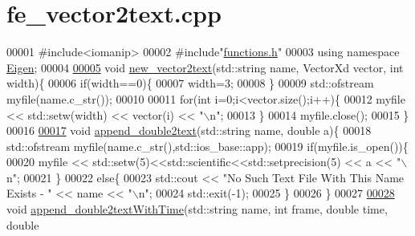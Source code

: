 \hypertarget{fe__vector2text_8cpp_source}{}\section{fe\+\_\+vector2text.\+cpp}
\label{fe__vector2text_8cpp_source}

\begin{DoxyCode}
00001 \textcolor{preprocessor}{#include<iomanip>}
00002 \textcolor{preprocessor}{#include"\hyperlink{functions_8h}{functions.h}"}
00003 \textcolor{keyword}{using namespace }\hyperlink{namespace_eigen}{Eigen};
00004 
\hyperlink{fe__vector2text_8cpp_a62d4a4906ace3f822fcebf7605c33c2b}{00005} \textcolor{keywordtype}{void} \hyperlink{fe__vector2text_8cpp_a62d4a4906ace3f822fcebf7605c33c2b}{new\_vector2text}(std::string name, VectorXd vector, \textcolor{keywordtype}{int} width)\{
00006     \textcolor{keywordflow}{if}(width==0)\{
00007             width=3;
00008         \}
00009     std::ofstream myfile(name.c\_str());
00010 
00011     \textcolor{keywordflow}{for}(\textcolor{keywordtype}{int} i=0;i<vector.size();i++)\{
00012         myfile << std::setw(width) << vector(i) << \textcolor{stringliteral}{"\(\backslash\)n"};
00013     \}
00014     myfile.close();
00015 \}
00016 
\hyperlink{fe__vector2text_8cpp_aab8577bce9169902e0f328ddbc334cdc}{00017} \textcolor{keywordtype}{void} \hyperlink{fe__vector2text_8cpp_aab8577bce9169902e0f328ddbc334cdc}{append\_double2text}(std::string name, \textcolor{keywordtype}{double} a)\{
00018     std::ofstream myfile(name.c\_str(),std::ios\_base::app);
00019     \textcolor{keywordflow}{if}(myfile.is\_open())\{
00020         myfile << std::setw(5)<<std::scientific<<std::setprecision(5) << a << \textcolor{stringliteral}{"\(\backslash\)n"};
00021     \}
00022     \textcolor{keywordflow}{else}\{
00023         std::cout << \textcolor{stringliteral}{"No Such Text File With This Name Exists - "} << name << \textcolor{stringliteral}{"\(\backslash\)n"};
00024         std::exit(-1);
00025     \}
00026 \}
00027 
\hyperlink{fe__vector2text_8cpp_a6908d3739a96b475c5f4c1623fad9316}{00028} \textcolor{keywordtype}{void} \hyperlink{fe__vector2text_8cpp_a6908d3739a96b475c5f4c1623fad9316}{append\_double2textWithTime}(std::string name, \textcolor{keywordtype}{int} frame, \textcolor{keywordtype}{double} time, \textcolor{keywordtype}{double} 

\end{DoxyCode}
